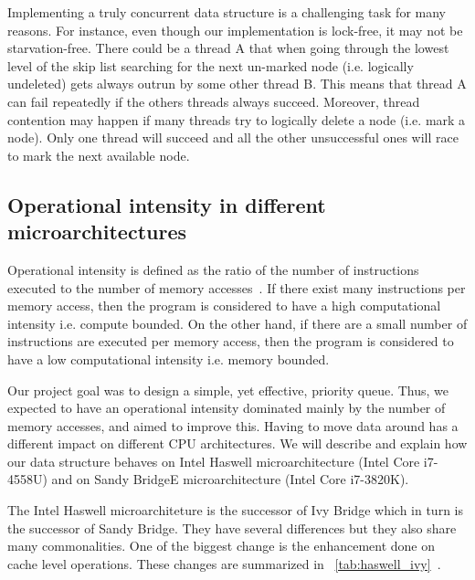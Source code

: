 Implementing a truly concurrent data structure is a challenging task for many reasons. For instance, even though our implementation is lock-free, it may not be starvation-free. There could be a thread A that when going through the lowest level of the skip list searching for the next un-marked node (i.e. logically undeleted) gets always outrun by some other thread B. This means that thread A can fail repeatedly if the others threads always succeed. Moreover, thread contention may happen if many threads try to logically delete a node (i.e. mark a node). Only one thread will succeed and all the other unsuccessful ones will race to mark
the next available node.\\


\subsection{Operational intensity in different microarchitectures}
Operational intensity is defined as the ratio of the number of instructions executed to the number of memory accesses~\cite{roger1996science}. If there exist many instructions per memory access, then the program is considered to have a high computational intensity i.e. compute bounded. On the other hand, if there are a small number of instructions are executed per memory access, then the program is considered to have a low computational intensity i.e. memory bounded.

Our project goal was to design a simple, yet effective, priority queue. Thus, we expected to have an operational intensity dominated mainly by the number of memory accesses, and aimed to improve this. Having to move data around has a different impact on different CPU architectures. We will describe and explain how our data structure behaves on Intel Haswell microarchitecture (Intel Core i7-4558U) and on Sandy BridgeE microarchitecture (Intel Core i7-3820K). 

The Intel Haswell microarchiteture is the successor of Ivy Bridge which in turn is the successor of Sandy Bridge. They have several differences but they also share many commonalities. One of the biggest change is the enhancement done on cache level operations. These changes are summarized in \tablename~\ref{tab:haswell_ivy}~\cite{ijcsit2013040321, microarchitecture, haswell_arch}.


